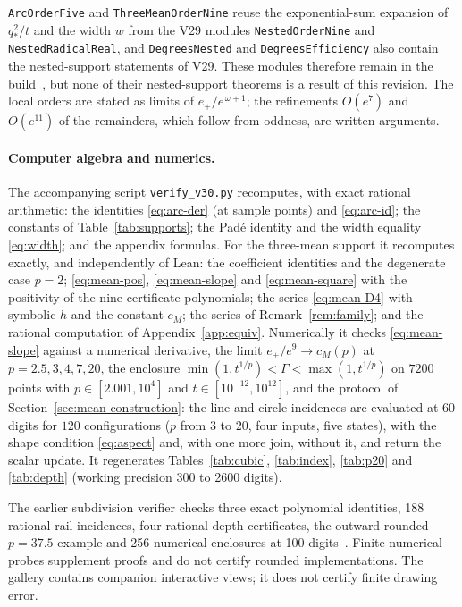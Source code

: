 \texttt{ArcOrderFive} and \texttt{ThreeMeanOrderNine} reuse the exponential-sum expansion of
$q_*^{2}/t$ and the width $w$ from the V29 modules \texttt{NestedOrderNine} and
\texttt{NestedRadicalReal}, and \texttt{DegreesNested} and \texttt{DegreesEfficiency} also contain the
nested-support statements of V29. These modules therefore remain in the build~\cite{supplNR}, but none of
their nested-support theorems is a result of this revision. The local orders are stated as limits of
$e_+/e^{\,\omega+1}$; the refinements $O(e^{7})$ and $O(e^{11})$ of the remainders, which follow from
oddness, are written arguments.

\paragraph{Computer algebra and numerics.}
The accompanying script \texttt{verify\_v30.py} recomputes, with exact rational arithmetic: the
identities \eqref{eq:arc-der} (at sample points) and \eqref{eq:arc-id}; the constants of
Table~\ref{tab:supports}; the Pad\'e identity and the width equality \eqref{eq:width}; and the appendix
formulas. For the three-mean support it recomputes exactly, and independently of Lean: the coefficient
identities and the degenerate case $p=2$; \eqref{eq:mean-pos}, \eqref{eq:mean-slope} and
\eqref{eq:mean-square} with the positivity of the nine certificate polynomials; the series
\eqref{eq:mean-D4} with symbolic $h$ and the constant $c_M$; the series of Remark~\ref{rem:family}; and
the rational computation of Appendix~\ref{app:equiv}. Numerically it checks \eqref{eq:mean-slope}
against a numerical derivative, the limit $e_+/e^{9}\to c_M(p)$ at $p=2.5,3,4,7,20$, the enclosure
$\min(1,t^{1/p})<\Gamma<\max(1,t^{1/p})$ on $7200$ points with $p\in[2.001,10^{4}]$ and
$t\in[10^{-12},10^{12}]$, and the protocol of Section~\ref{sec:mean-construction}: the line and circle
incidences are evaluated at $60$ digits for $120$ configurations ($p$ from $3$ to $20$, four inputs,
five states), with the shape condition \eqref{eq:aspect} and, with one more join, without it, and
return the scalar update. It regenerates Tables~\ref{tab:cubic}, \ref{tab:index}, \ref{tab:p20} and
\ref{tab:depth} (working precision 300 to 2600 digits).

The earlier subdivision verifier checks three exact polynomial identities, 188 rational rail
incidences, four rational depth certificates, the outward-rounded $p=37.5$ example and 256 numerical
enclosures at 100 digits~\cite{supplS}. Finite numerical probes supplement proofs and do not certify
rounded implementations. The gallery contains companion interactive views; it does not certify finite
drawing error.

